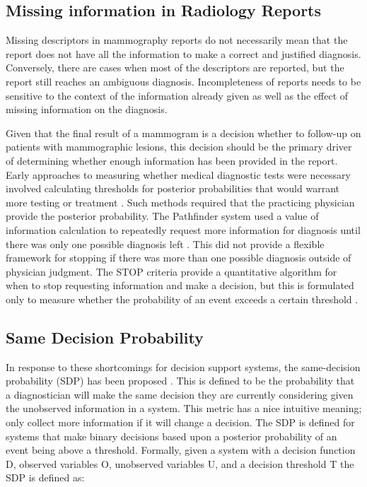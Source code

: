 \subsection{Missing information in Radiology Reports}
Missing descriptors in mammography reports do not necessarily mean that the report does not have all the information to make a correct and justified diagnosis. Conversely, there are cases when most of the descriptors are reported, but the report still reaches an ambiguous diagnosis. Incompleteness of reports needs to be sensitive to the context of the information already given as well as the effect of missing information on the diagnosis. 

Given that the final result of a mammogram is a decision whether to follow-up on patients with mammographic lesions, this decision should be the primary driver of determining whether enough information has been provided in the report. Early approaches to measuring whether medical diagnostic tests were necessary involved calculating thresholds for posterior probabilities that would warrant more testing or treatment \cite{Pauker:1980cg}. Such methods required that the practicing physician provide the posterior probability. The Pathfinder system used a value of information calculation to repeatedly request more information for diagnosis until there was only one possible diagnosis left \cite{Heckerman:1992uq}. This did not provide a flexible framework for stopping if there was more than one possible diagnosis outside of physician judgment. The STOP criteria provide a quantitative algorithm for when to stop requesting information and make a decision, but this is formulated only to measure whether the probability of an event exceeds a certain threshold \cite{Gaag:2011gs}. 

\subsection{Same Decision Probability}
In response to these shortcomings for decision support systems, the same-decision probability (SDP) has been proposed \cite{Choi:2012id}. This is defined to be the probability that a diagnostician will make the same decision they are currently considering given the unobserved information in a system. This metric has a nice intuitive meaning; only collect more information if it will change a decision. The SDP is defined for systems that make binary decisions based upon a posterior probability of an event being above a threshold. Formally, given a system with a decision function D, observed variables O, unobserved variables U, and a decision threshold T the SDP is defined as:

